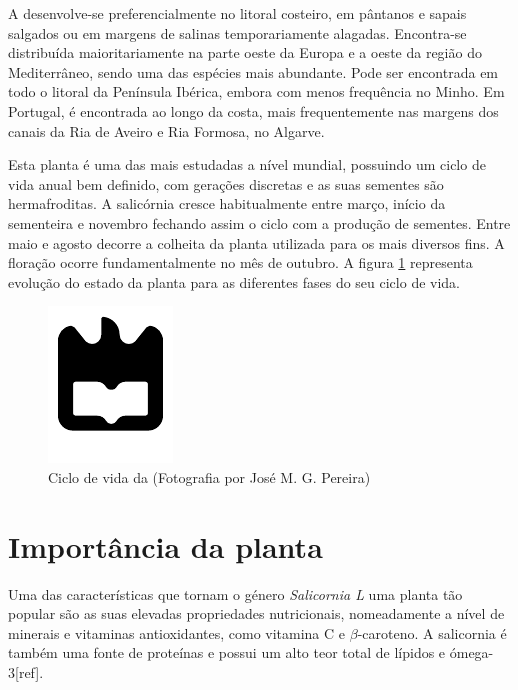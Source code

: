 A \sr desenvolve-se preferencialmente no litoral costeiro, em pântanos e sapais salgados ou em margens de salinas temporariamente alagadas. Encontra-se distribuída maioritariamente na parte oeste da Europa e a oeste da região do Mediterrâneo, sendo uma das espécies mais abundante\cite{Figueroa1987}. Pode ser encontrada em todo o litoral da Península Ibérica, embora com menos frequência no Minho\cite{Silva2000}. Em Portugal, é encontrada ao longo da costa, mais frequentemente nas margens dos canais da Ria de Aveiro e Ria Formosa, no Algarve\cite{RaquelPinto}. 

Esta planta é uma das mais estudadas a nível mundial\cite{Figueroa1987}, possuindo um ciclo de vida anual bem definido, com gerações discretas e as suas sementes são hermafroditas\cite{Silva2007}. A salicórnia cresce habitualmente entre março, início da sementeira e novembro fechando assim o ciclo com a produção de sementes. Entre maio  e agosto decorre a colheita da planta\cite{RaquelPinto} utilizada para os mais diversos fins. A floração ocorre fundamentalmente no mês de outubro\cite{Figueroa1987}. A figura \ref{ciclodevida} representa evolução do estado da planta para as diferentes fases do seu ciclo de vida. 




 \begin{figure}[!htb]
 	\centering
 	\includegraphics{uaLogoNew.pdf}
 	\caption{Ciclo de vida da \sr (Fotografia por José M. G. Pereira)}
 	\label{ciclodevida}
 \end{figure}
 
 



\newpage

\section{Importância da planta}


Uma das características que tornam o género \textit{Salicornia L} uma planta tão popular são as suas elevadas propriedades nutricionais, nomeadamente a nível de minerais e vitaminas antioxidantes, como vitamina C e $\beta$-caroteno. A salicornia é também uma fonte de proteínas e possui um alto teor total de lípidos e ómega-3[ref].   %


